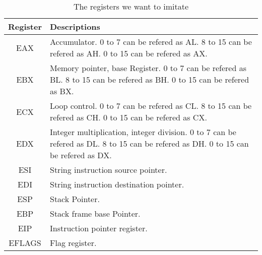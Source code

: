 \documentclass[12pt]{extarticle}
\begin{document}


\bigskip
\begin{table}[h!]
    \centering
    \begin{tabular}{||c | p{9cm}||} 
     \hline
     Register & Descriptions \\ [0.5ex] 
     \hline
     EAX & Accumulator. 0 to 7 can be refered as AL. 8 to 15 can be refered as AH. 0 to 15 can be refered as AX. \\ 
     \hline
     EBX & Memory pointer, base Register. 0 to 7 can be refered as BL. 8 to 15 can be refered as BH. 0 to 15 can be refered as BX. \\
     \hline
     ECX & Loop control. 0 to 7 can be refered as CL. 8 to 15 can be refered as CH. 0 to 15 can be refered as CX. \\
     \hline
     EDX & Integer multiplication, integer division. 0 to 7 can be refered as DL. 8 to 15 can be refered as DH. 0 to 15 can be refered as DX. \\
     \hline
     ESI & String instruction source pointer. \\
     \hline
     EDI & String instruction destination pointer. \\
     \hline
     ESP & Stack Pointer. \\
     \hline
     EBP & Stack frame base Pointer. \\
     \hline
     EIP & Instruction pointer register. \\
     \hline
     EFLAGS & Flag register. \\
     \hline
    \end{tabular}
    \caption{The registers we want to imitate}
    \label{table:1}
\end{table}
\end{document}
